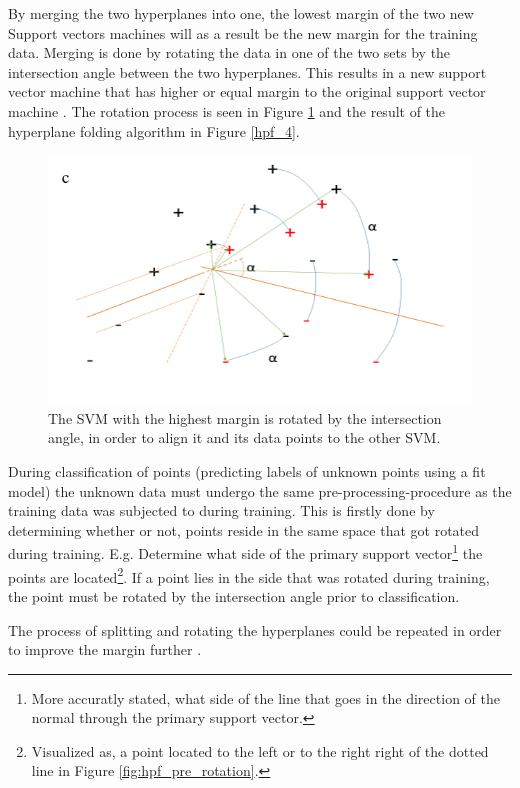 \documentclass[a4paper,twoside]{bth}
\begin{document}
\par By merging the two hyperplanes into one, the lowest margin of the two new Support vectors machines will as a result be the new margin for the training data. Merging is done by rotating the data in one of the two sets by the intersection angle between the two hyperplanes. This results in a new support vector machine that has higher or equal margin to the original support vector machine \cite{unpublished}. The rotation process is seen in Figure \ref{hpf_3} and the result of the hyperplane folding algorithm in Figure \ref{hpf_4}.

\begin{figure}
\centering
\includegraphics[scale=0.7]{images/intro-images/hpf_3.png}
   \caption{The SVM with the highest margin is rotated by the intersection angle, in order to align it and its data points to the other SVM. }
   \label{hpf_3}
\end{figure}
\par During classification of points (predicting labels of unknown points using a fit model) the unknown data must undergo the same pre-processing-procedure as the training data was subjected to during training. This is firstly done by determining whether or not, points reside in the same space that got rotated during training. E.g. Determine what side of the primary support vector\footnote{More accuratly stated, what side of the line that goes in the direction of the normal through the primary support vector.} the points are located\footnote{Visualized as, a point located to the left or to the right right of the dotted line in Figure \ref{fig:hpf_pre_rotation}.}. If a point lies in the side that was rotated during training, the point must be rotated by the intersection angle prior to classification. 

\par The process of splitting and rotating the hyperplanes could be repeated in order to improve the margin further \cite{unpublished}.
\end{document}
